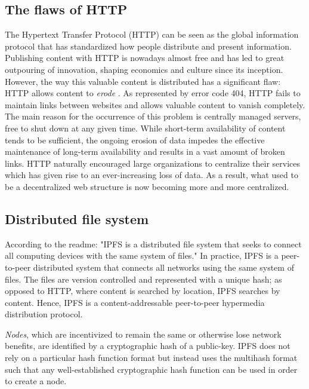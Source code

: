 \documentclass[conference]{IEEEtran}
\begin{document}
\subsection{The flaws of HTTP}
The Hypertext Transfer Protocol (HTTP) can be seen as the global information protocol that has standardized how people distribute and present information.
Publishing content with HTTP is nowadays almost free and has led to great outpouring of innovation, shaping economics and culture since its inception.
However, the way this valuable content is distributed has a significant flaw: HTTP allows content to \textit{erode} \cite{http-obsolete}.
As represented by error code 404\cite{http-rfc}, HTTP fails to maintain links between websites and allows valuable content to vanish completely.
The main reason for the occurrence of this problem is centrally managed servers, free to shut down at any given time.
While short-term availability of content tends to be sufficient, the ongoing erosion of data impedes the effective maintenance of long-term availability and results in a vast amount of broken links\cite{broken-links}.
HTTP naturally encouraged large organizations to centralize their services which has given rise to an ever-increasing loss of data.
As a result, what used to be a decentralized web  structure is now becoming more and more centralized.

\subsection{Distributed file system}
\label{subsec:ipfs-dfs}
According to the readme\cite{ipfs-github}: "IPFS is a distributed file system that seeks to connect all computing devices with the same system of files."
In practice, IPFS is a peer-to-peer distributed system that connects all networks using the same system of files. 
The files are version controlled and represented with a unique hash; as opposed to HTTP, where content is searched by location, IPFS searches by content.
Hence, IPFS is a content-addressable peer-to-peer hypermedia distribution protocol.

\textit{Nodes}, which are incentivized to remain the same or otherwise lose network benefits, are identified by a cryptographic hash of a public-key.
IPFS does not rely on a particular hash function format but instead uses the multihash\cite{multihash} format such that any well-established cryptographic hash function can be used in order to create a node.
\end{document}
